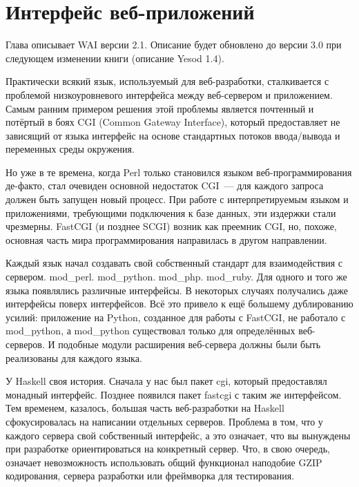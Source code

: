 \chapter{Интерфейс веб-приложений}\label{chap:web_application_interface}

\begin{remark}
    Глава описывает WAI версии 2.1. Описание будет обновлено до версии 3.0 при
    следующем изменении книги (описание Yesod 1.4).
\end{remark}

Практически всякий язык, используемый для веб-разработки, сталкивается с
проблемой низкоуровневого интерфейса между веб-сервером и приложением. Самым
ранним примером решения этой проблемы является почтенный и потёртый в боях CGI
(Common Gateway Interface), который предоставляет не зависящий от языка
интерфейс на основе стандартных потоков ввода/вывода и переменных среды
окружения.

Но уже в те времена, когда Perl только становился языком веб-программирования
де-факто, стал очевиден основной недостаток CGI~--- для каждого запроса должен
быть запущен новый процесс. При работе с интерпретируемым языком и
приложениями, требующими подключения к базе данных, эти издержки стали
чрезмерны. FastCGI (и позднее SCGI) возник как преемник CGI, но, похоже,
основная часть мира программирования направилась в другом направлении.

Каждый язык начал создавать свой собственный стандарт для взаимодействия с
сервером.  mod\_perl. mod\_python. mod\_php. mod\_ruby. Для одного и того же
языка появлялись различные интерфейсы. В некоторых случаях получались даже
интерфейсы поверх интерфейсов.  Всё это привело к ещё большему дублированию
усилий: приложение на Python, созданное для работы с FastCGI, не работало с
mod\_python, а mod\_python существовал только для определённых веб-серверов. И
подобные модули расширения веб-сервера должны были быть реализованы для каждого
языка.

У Haskell своя история. Сначала у нас был пакет cgi, который предоставлял
монадный интерфейс. Позднее появился пакет fastcgi с таким же интерфейсом.  Тем
временем, казалось, большая часть веб-разработки на Haskell сфокусировалась на
написании отдельных серверов.  Проблема в том, что у каждого сервера свой
собственный интерфейс, а это означает, что вы вынуждены при разработке
ориентироваться на конкретный сервер. Что, в свою очередь, означает
невозможность использовать общий функционал наподобие GZIP кодирования, сервера
разработки или фреймворка для тестирования.

